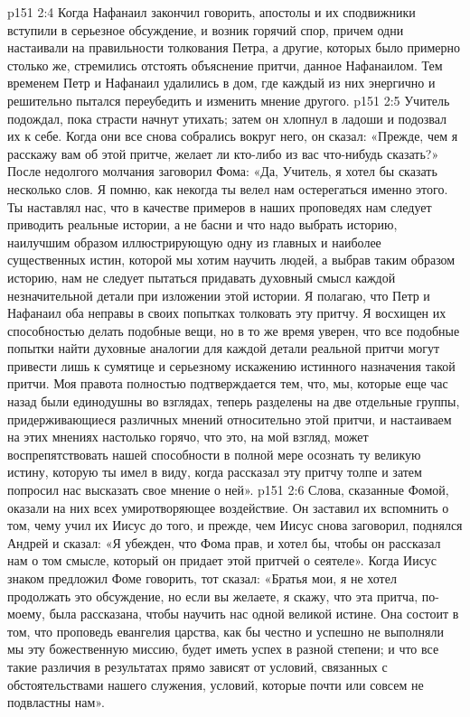 \vs p151 2:4 Когда Нафанаил закончил говорить, апостолы и их сподвижники вступили в серьезное обсуждение, и возник горячий спор, причем одни настаивали на правильности толкования Петра, а другие, которых было примерно столько же, стремились отстоять объяснение притчи, данное Нафанаилом. Тем временем Петр и Нафанаил удалились в дом, где каждый из них энергично и решительно пытался переубедить и изменить мнение другого.
\vs p151 2:5 Учитель подождал, пока страсти начнут утихать; затем он хлопнул в ладоши и подозвал их к себе. Когда они все снова собрались вокруг него, он сказал: «Прежде, чем я расскажу вам об этой притче, желает ли кто\hyp{}либо из вас что\hyp{}нибудь сказать?» После недолгого молчания заговорил Фома: «Да, Учитель, я хотел бы сказать несколько слов. Я помню, как некогда ты велел нам остерегаться именно этого. Ты наставлял нас, что в качестве примеров в наших проповедях нам следует приводить реальные истории, а не басни и что надо выбрать историю, наилучшим образом иллюстрирующую одну из главных и наиболее существенных истин, которой мы хотим научить людей, а выбрав таким образом историю, нам не следует пытаться придавать духовный смысл каждой незначительной детали при изложении этой истории. Я полагаю, что Петр и Нафанаил оба неправы в своих попытках толковать эту притчу. Я восхищен их способностью делать подобные вещи, но в то же время уверен, что все подобные попытки найти духовные аналогии для каждой детали реальной притчи могут привести лишь к сумятице и серьезному искажению истинного назначения такой притчи. Моя правота полностью подтверждается тем, что, мы, которые еще час назад были единодушны во взглядах, теперь разделены на две отдельные группы, придерживающиеся различных мнений относительно этой притчи, и настаиваем на этих мнениях настолько горячо, что это, на мой взгляд, может воспрепятствовать нашей способности в полной мере осознать ту великую истину, которую ты имел в виду, когда рассказал эту притчу толпе и затем попросил нас высказать свое мнение о ней».
\vs p151 2:6 Слова, сказанные Фомой, оказали на них всех умиротворяющее воздействие. Он заставил их вспомнить о том, чему учил их Иисус до того, и прежде, чем Иисус снова заговорил, поднялся Андрей и сказал: «Я убежден, что Фома прав, и хотел бы, чтобы он рассказал нам о том смысле, который он придает этой притчей о сеятеле». Когда Иисус знаком предложил Фоме говорить, тот сказал: «Братья мои, я не хотел продолжать это обсуждение, но если вы желаете, я скажу, что эта притча, по\hyp{}моему, была рассказана, чтобы научить нас одной великой истине. Она состоит в том, что проповедь евангелия царства, как бы честно и успешно не выполняли мы эту божественную миссию, будет иметь успех в разной степени; и что все такие различия в результатах прямо зависят от условий, связанных с обстоятельствами нашего служения, условий, которые почти или совсем не подвластны нам».
